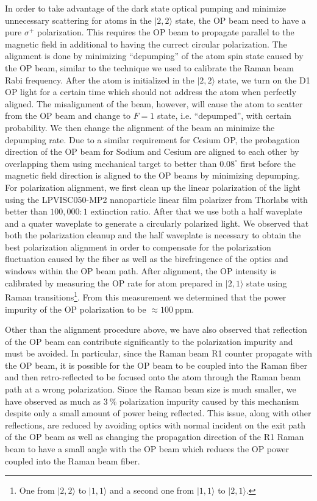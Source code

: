 In order to take advantage of the dark state optical pumping and
minimize unnecessary scattering for atoms in the $|2,2\rangle$ state,
the OP beam need to have a pure $\sigma^+$ polarization.
This requires the OP beam to propagate parallel to the magnetic field
in additional to having the currect circular polarization.
The alignment is done by minimizing ``depumping'' of the atom spin state caused by the OP beam,
similar to the technique we used to calibrate the Raman beam Rabi frequency.
After the atom is initialized in the $|2,2\rangle$ state, we turn on the D1 OP light
for a certain time which should not address the atom when perfectly aligned.
The misalignment of the beam, however, will cause the atom to scatter from the OP beam
and change to $F=1$ state, i.e. ``depumped'', with certain probability.
We then change the alignment of the beam an minimize the depumping rate.
Due to a similar requirement for Cesium OP, the probagation direction of
the OP beam for Sodium and Cesium are aligned to each other by overlapping them
using mechanical target to better than $0.08^\circ$ first
before the magnetic field direction is aligned to the OP beams by minimizing depumping.
For polarization alignment, we first clean up the linear polarization of the light
using the LPVISC050-MP2  nanoparticle linear film polarizer from Thorlabs
with better than $100,000:1$ extinction ratio.
After that we use both a half waveplate and a quater waveplate
to generate a circularly polarized light.
We observed that both the polarization cleanup and the half waveplate is necessary
to obtain the best polarization alignment in order to compensate for the polarization
fluctuation caused by the fiber as well as the birefringence of the optics and windows
within the OP beam path. After alignment, the OP intensity is calibrated
by measuring the OP rate for atom prepared in $|2,1\rangle$ state
using Raman transitions\footnote{One from $|2,2\rangle$ to $|1,1\rangle$
  and a second one from $|1,1\rangle$ to $|2,1\rangle$.}.
From this measurement we determined that the power impurity of the OP polarization
to be $\approx\!100~\mathrm{ppm}$.

Other than the alignment procedure above, we have also observed that reflection
of the OP beam can contribute significantly to the polarization impurity and
must be avoided. In particular, since the Raman beam R1 counter propagate with the OP beam,
it is possible for the OP beam to be coupled into the Raman fiber and then retro-reflected
to be focused onto the atom through the Raman beam path at a wrong polarization.
Since the Raman beam size is much smaller, we have observed as much as $3~\mathrm{\%}$
polarization impurity caused by this mechanism despite only a small amount of
power being reflected. This issue, along with other reflections,
are reduced by avoiding optics with normal incident on the exit path of the OP beam
as well as changing the propagation direction of the R1 Raman beam
to have a small angle with the OP beam which reduces the OP power coupled into
the Raman beam fiber.


